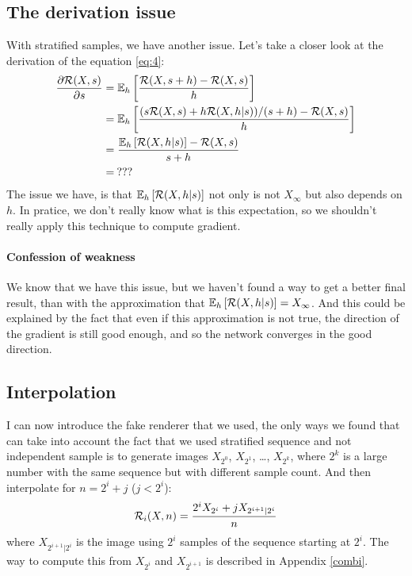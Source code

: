 \documentclass{classeENS}
\begin{document}
\subsection{The derivation issue}

With stratified samples, we have another issue.
Let's take a closer look at the derivation of the equation \ref{eq:4}:
\begin{align*}
    \label{eq:4}
 \frac{\partial \mathcal R(X,s)}{\partial s} & = \mathbb E_h \left [\frac{\mathcal R(X,s+h) - \mathcal R(X,s)}{h} \right ] \\
    & = \mathbb E_h \left [\frac{(s\mathcal R(X,s) + h\mathcal R(X,h | s))/(s+h) - \mathcal R(X,s)}{h}\right ] \\
    & = \frac{\mathbb E_h \left [\mathcal R(X,h | s) \right ] - \mathcal R(X,s)}{s+h} \\
    & =\:???
\end{align*}
The issue we have, is that $\mathbb E_h \left [\mathcal R(X,h | s) \right ]$ not only is not $X_\infty$ 
but also depends on $h$. In pratice, we don't really know what is this expectation, so we
shouldn't really apply this technique to compute gradient.

\paragraph*{Confession of weakness} We know that we have this issue, but we haven't found 
a way to get a better final result, than with the approximation that 
$\mathbb E_h \left [\mathcal R(X,h | s) \right ] = X_\infty$. And this could be explained by the fact that 
even if this approximation is not true, the direction of the gradient is still good 
enough, and so the network converges in the good direction.

\subsection{Interpolation}

I can now introduce the fake renderer that we used, the only ways we found that can
take into account the fact that we used stratified sequence and not independent sample
is to generate images $X_{2^0}$, $X_{2^1}$, \dots, $X_{2^k}$, where $2^k$ is a large number
with the same sequence but with different sample count. And then interpolate for 
$n = 2^i + j$ ($j < 2^i$):
\begin{equation}
    \label{eq:5}
    \mathcal R_i(X,n) = \frac{2^i X_{2^i} + j X_{2^{i+1} | 2^i}}{n}
\end{equation}
where $X_{2^{i+1} | 2^i}$ is the image using $2^i$ samples of the sequence starting at 
$2^i$. The way to compute this from $X_{2^i}$ and $X_{2^{i+1}}$ is described in Appendix \ref{combi}.
\end{document}
